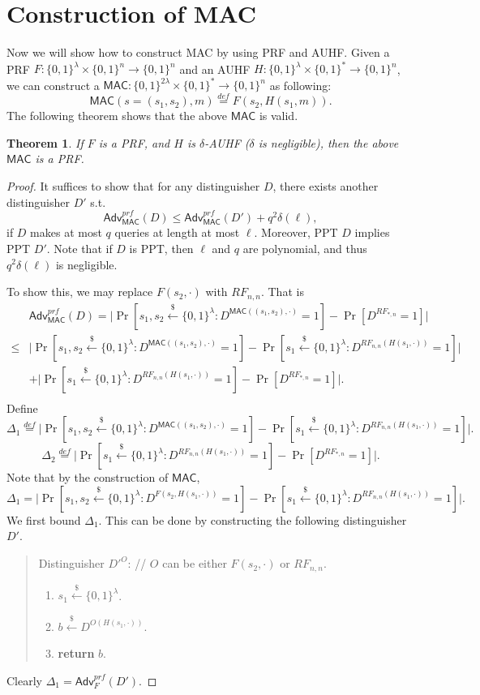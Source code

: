 \documentclass[12pt]{article}
\newcommand{\eqdef}{\stackrel{def}{=}}
\newcommand{\bits}{\{0,1\}}
\newcommand{\getsr}{\stackrel{\$}{\gets}}
\newcommand{\Adv}{\mathsf{Adv}}
\newcommand{\MAC}{\mathsf{MAC}}
\newtheorem{theorem}{Theorem}[section]
\theoremstyle{definition}
\begin{document}
\section{Construction of MAC}
Now we will show how to construct MAC by using PRF and AUHF. Given a PRF $F : \bits^\lambda \times \bits^n \to \bits^n$ and an AUHF $H : \bits^\lambda \times \bits^* \to \bits^n$, we can construct a $\MAC : \bits^{2\lambda} \times \bits^* \to \bits^n$ as following:
$$\MAC (s = (s_1,s_2), m) \eqdef F(s_2, H(s_1, m)).$$
The following theorem shows that the above $\MAC$ is valid.

\begin{theorem}
If $F$ is a PRF, and $H$ is $\delta$-AUHF ($\delta$ is negligible), then the above $\MAC$ is a PRF.
\end{theorem}
\begin{proof}
It suffices to show that for any distinguisher $D$, there exists another distinguisher $D'$ s.t. 
$$\Adv_{\MAC}^{prf}(D) \leq \Adv_{\MAC}^{prf}(D') + q^2 \delta(\ell),$$
if $D$ makes at most $q$ queries at length at most $\ell$. 
Moreover, PPT $D$ implies PPT $D'$.
Note that if $D$ is PPT, then $\ell$ and $q$ are polynomial, and thus $q^2 \delta(\ell)$ is negligible.

To show this, we may replace $F(s_2,\cdot)$ with $RF_{n,n}$. That is
$$\begin{aligned}
&\Adv_{\MAC}^{prf}(D) = \bigg| \Pr[s_1,s_2 \getsr \bits^\lambda : D^{\MAC((s_1,s_2),\cdot)}=1] - \Pr[D^{RF_{*,n}}=1] \bigg| \\
\leq & \bigg| \Pr[s_1,s_2 \getsr \bits^\lambda : D^{\MAC((s_1,s_2),\cdot)}=1] - \Pr[s_1 \getsr \bits^\lambda : D^{RF_{n,n}(H(s_1,\cdot))}=1] \bigg| \\
&+ \bigg| \Pr[s_1 \getsr \bits^\lambda : D^{RF_{n,n}(H(s_1,\cdot))}=1] - \Pr[D^{RF_{*,n}}=1] \bigg|. \\
\end{aligned}$$
Define
$$\Delta_1 \eqdef \bigg| \Pr[s_1,s_2 \getsr \bits^\lambda : D^{\MAC((s_1,s_2),\cdot)}=1] - \Pr[s_1 \getsr \bits^\lambda : D^{RF_{n,n}(H(s_1,\cdot))}=1] \bigg|.$$
$$\Delta_2 \eqdef \bigg| \Pr[s_1 \getsr \bits^\lambda : D^{RF_{n,n}(H(s_1,\cdot))}=1] - \Pr[D^{RF_{*,n}}=1] \bigg|.$$
Note that by the construction of $\MAC$,
$$\Delta_1 = \bigg| \Pr[s_1,s_2 \getsr \bits^\lambda : D^{F(s_2,H(s_1,\cdot))}=1] - \Pr[s_1 \getsr \bits^\lambda : D^{RF_{n,n}(H(s_1,\cdot))}=1] \bigg|.$$
We first bound $\Delta_1$. This can be done by constructing the following distinguisher $D'$.
\begin{quote}
Distinguisher $D'^O$: // $O$ can be either $F(s_2, \cdot)$ or $RF_{n,n}$.
\begin{enumerate}
\item $s_1 \getsr \bits^\lambda$.
\item $b \getsr D^{O(H(s_1,\cdot))}$.
\item {\bf return} $b$.
\end{enumerate}
\end{quote}
Clearly $\Delta_1 = \Adv_{F}^{prf}(D')$.


\end{proof}
\end{document}
